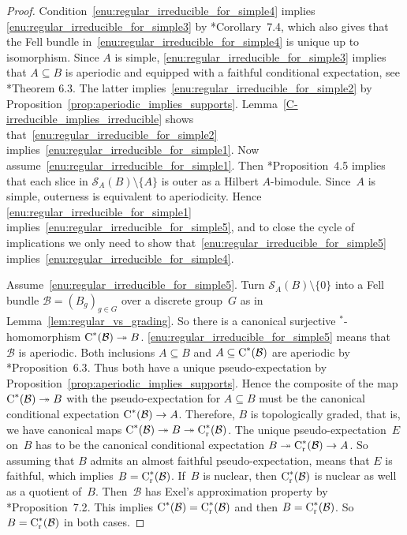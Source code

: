 \documentclass[a4paper]{amsart}
\theoremstyle{plain}
\theoremstyle{definition}
\theoremstyle{remark}
\numberwithin{theorem}{section}
\numberwithin{equation}{section}
\newcommand*{\nb}{\nobreakdash}
\newcommand*{\Star}{\(^*\)\nobreakdash-}
\newcommand*{\red}{\mathrm{r}}%
\newcommand*{\Cst}{\textup C^*}%
\newcommand*{\Slice}{\mathcal S}%
\newcommand*{\B}{\mathcal B}%
\newcommand*{\onto}{\twoheadrightarrow}
\begin{document}
\begin{proof}
  Condition~\ref{enu:regular_irreducible_for_simple4} implies
  \ref{enu:regular_irreducible_for_simple3}
  by
  \cite{Kwasniewski-Meyer:Cartan}*{Corollary~7.4}, which also gives
  that the Fell bundle in~\ref{enu:regular_irreducible_for_simple4}
  is unique up to isomorphism.
  Since \(A\) is simple, \ref{enu:regular_irreducible_for_simple3}
  implies that \(A\subseteq B\) is aperiodic and equipped with a
  faithful conditional expectation, see
  \cite{Kwasniewski-Meyer:Cartan}*{Theorem 6.3}.
  The latter  implies~\ref{enu:regular_irreducible_for_simple2} by
  Proposition~\ref{prop:aperiodic_implies_supports}.
  Lemma~\ref{C-irreducible_implies_irreducible}
  shows that~\ref{enu:regular_irreducible_for_simple2}
  implies~\ref{enu:regular_irreducible_for_simple1}.
  Now assume~\ref{enu:regular_irreducible_for_simple1}.
  Then \cite{Kwasniewski-Meyer:Cartan}*{Proposition~4.5} implies that
  each slice in \(\Slice_A(B)\setminus \{A\}\) is outer as a Hilbert
  \(A\)\nb-bimodule.
  Since~\(A\) is simple, outerness is equivalent to aperiodicity.
  Hence \ref{enu:regular_irreducible_for_simple1}
  implies~\ref{enu:regular_irreducible_for_simple5}, and
  to close the cycle of implications we only need to show
  that~\ref{enu:regular_irreducible_for_simple5}
  implies~\ref{enu:regular_irreducible_for_simple4}.

  Assume~\ref{enu:regular_irreducible_for_simple5}.
  Turn \(\Slice_A(B)\setminus \{0\}\) into a Fell bundle
  \(\B=(B_g)_{g\in G}\) over a discrete group~\(G\) as in
  Lemma~\ref{lem:regular_vs_grading}.
  So there is a canonical surjective \Star{}homomorphism
  \(\Cst(\B)\onto B\).
  \ref{enu:regular_irreducible_for_simple5} means that~\(\B\) is
  aperiodic.
  Both inclusions \(A\subseteq B\) and \(A\subseteq \Cst(\B)\)
  are aperiodic by
  \cite{Kwasniewski-Meyer:Essential}*{Proposition~6.3}.
  Thus both have a unique pseudo-expectation by
  Proposition~\ref{prop:aperiodic_implies_supports}.
  Hence the composite of the map \(\Cst(\B)\onto B\) with the
  pseudo-expectation for \(A\subseteq B\) must be the canonical
  conditional expectation \(\Cst(\B)\to A\).
  Therefore, \(B\) is topologically graded, that is, we have canonical
  maps \(\Cst(\B) \onto B\onto \Cst_\red(\B)\).
  The unique pseudo-expectation~\(E\) on~\(B\) has to be the canonical
  conditional expectation \(B\onto \Cst_\red(\B)\to A\).
  So assuming that $B$ admits an almost faithful pseudo-expectation, means 
	that \(E\) is   faithful, which implies \(B= \Cst_\red(\B)\).
  If~\(B\) is nuclear, then \(\Cst_\red(\B)\) is nuclear as well as a
  quotient of~\(B\).
  Then~\(\B\) has Exel's approximation property by
  \cite{Abadie-Buss-Ferraro:Amenability}*{Proposition~7.2}.
  This implies \(\Cst(\B)=\Cst_\red(\B)\) and then \(B=\Cst_\red(\B)\).
  So \(B= \Cst_\red(\B)\) in both cases.


\end{proof}
\end{document}
